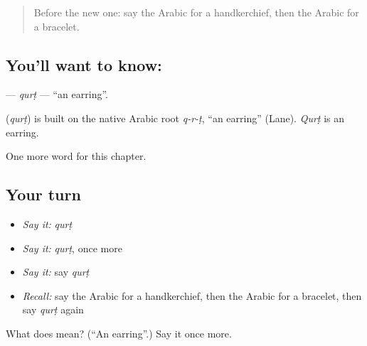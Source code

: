 \label{lesson:AR-C127-qurt}



\begin{quote}
Before the new one: say the Arabic for a handkerchief, then the Arabic for a bracelet.
\end{quote}

\subsection*{You'll want to know: }
\textbf{} — \emph{qurṭ} — \textquotedblleft{}an earring\textquotedblright{}.

\begin{cousinweb}
\textbf{} (\emph{qurṭ}) is built on the native Arabic root \emph{q-r-ṭ}, \textquotedblleft{}an earring\textquotedblright{} (Lane). \emph{Qurṭ} is an earring.
\end{cousinweb}

\begin{grammarlens}[title={What you've built}]
One more word for this chapter.
\end{grammarlens}

\subsection*{Your turn}
\begin{itemize}
\raggedright
  \item \emph{Say it:} \emph{qurṭ}
  \item \emph{Say it:} \emph{qurṭ}, once more
  \item \emph{Say it:} say \emph{qurṭ}
  \item \emph{Recall:} say the Arabic for a handkerchief, then the Arabic for a bracelet, then say \emph{qurṭ} again
\end{itemize}

\begin{tcolorbox}[breakable,colback=teal!4,colframe=teal!35!black,title={Before you move on}]
What does  mean? (\textquotedblleft{}An earring\textquotedblright{}.) Say it once more.
\end{tcolorbox}
